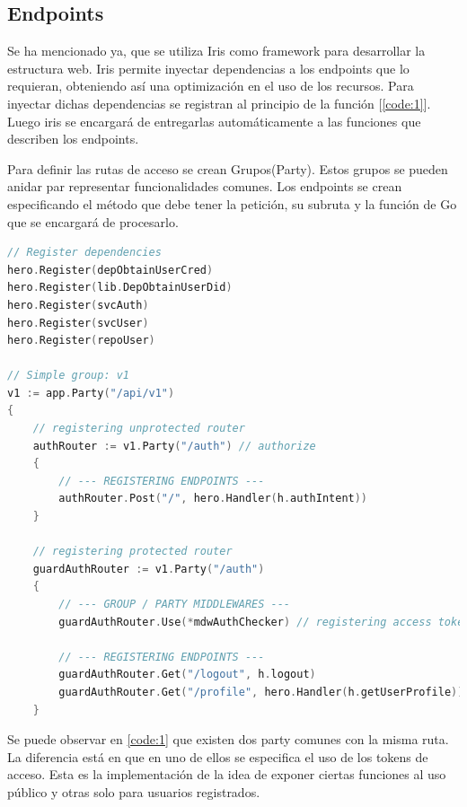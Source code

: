 \subsection{Endpoints}
Se ha mencionado ya, que se utiliza Iris como framework para desarrollar la estructura web. Iris permite inyectar dependencias a los endpoints que lo requieran, obteniendo así una optimización en el uso de los recursos. Para inyectar dichas dependencias se registran al principio de la función [\ref{code:1}]. Luego iris se encargará de entregarlas automáticamente a las funciones que describen los endpoints.

Para definir las rutas de acceso se crean Grupos(Party). Estos grupos se pueden anidar par representar funcionalidades comunes. Los endpoints se crean especificando el método que debe tener la petición, su subruta y la función de Go que se encargará de procesarlo.

\begin{lstlisting}[language=Go,caption={Sistema de rutas de Iris}, label={code:1}]
// Register dependencies	
hero.Register(depObtainUserCred)
hero.Register(lib.DepObtainUserDid)
hero.Register(svcAuth)
hero.Register(svcUser)
hero.Register(repoUser)

// Simple group: v1
v1 := app.Party("/api/v1")
{
	// registering unprotected router
	authRouter := v1.Party("/auth") // authorize
	{
		// --- REGISTERING ENDPOINTS ---
		authRouter.Post("/", hero.Handler(h.authIntent))
	}
	
	// registering protected router
	guardAuthRouter := v1.Party("/auth")
	{
		// --- GROUP / PARTY MIDDLEWARES ---
		guardAuthRouter.Use(*mdwAuthChecker) // registering access token checker middleware
		
		// --- REGISTERING ENDPOINTS ---
		guardAuthRouter.Get("/logout", h.logout)
		guardAuthRouter.Get("/profile", hero.Handler(h.getUserProfile))
	}
\end{lstlisting}

Se puede observar en \ref{code:1} que existen dos party comunes con la misma ruta. La diferencia está en que en uno de ellos se especifica el uso de los tokens de acceso. Esta es la implementación de la idea de exponer ciertas funciones al uso público y otras solo para usuarios registrados.

